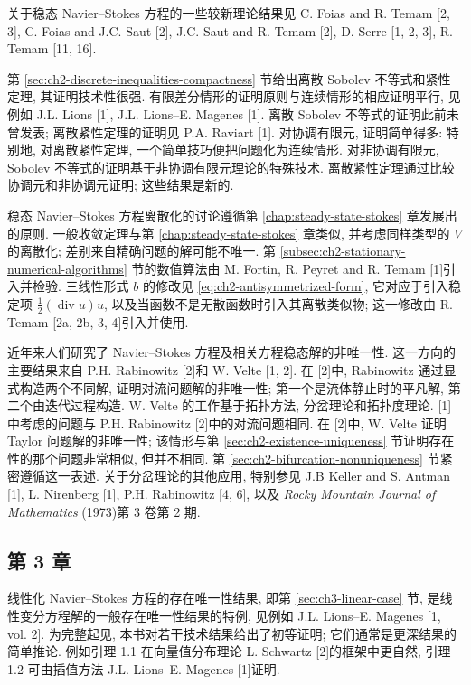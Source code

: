 关于稳态 Navier--Stokes 方程的一些较新理论结果见 C. Foias and R. Temam [2, 3], C. Foias and J.C. Saut [2], J.C. Saut and R. Temam [2], D. Serre [1, 2, 3], R. Temam [11, 16].

\hypertarget{comments-page-398}{}
第 \ref{sec:ch2-discrete-inequalities-compactness} 节给出离散 Sobolev 不等式和紧性定理, 其证明技术性很强. 有限差分情形的证明原则与连续情形的相应证明平行, 见例如 J.L. Lions [1], J.L. Lions--E. Magenes [1]. 离散 Sobolev 不等式的证明此前未曾发表; 离散紧性定理的证明见 P.A. Raviart [1]. 对协调有限元, 证明简单得多: 特别地, 对离散紧性定理, 一个简单技巧便把问题化为连续情形. 对非协调有限元, Sobolev 不等式的证明基于非协调有限元理论的特殊技术. 离散紧性定理通过比较协调元和非协调元证明; 这些结果是新的.

稳态 Navier--Stokes 方程离散化的讨论遵循第 \ref{chap:steady-state-stokes} 章发展出的原则. 一般收敛定理与第 \ref{chap:steady-state-stokes} 章类似, 并考虑同样类型的 $V$ 的离散化; 差别来自精确问题的解可能不唯一. 第 \ref{subsec:ch2-stationary-numerical-algorithms} 节的数值算法由 M. Fortin, R. Peyret and R. Temam [1]引入并检验. 三线性形式 $b$ 的修改见 \eqref{eq:ch2-antisymmetrized-form}, 它对应于引入稳定项 $\frac12(\operatorname{div}u)u$, 以及当函数不是无散函数时引入其离散类似物; 这一修改由 R. Temam [2a, 2b, 3, 4]引入并使用.

近年来人们研究了 Navier--Stokes 方程及相关方程稳态解的非唯一性. 这一方向的主要结果来自 P.H. Rabinowitz [2]和 W. Velte [1, 2]. 在 [2]中, Rabinowitz 通过显式构造两个不同解, 证明对流问题解的非唯一性; 第一个是流体静止时的平凡解, 第二个由迭代过程构造. W. Velte 的工作基于拓扑方法, 分岔理论和拓扑度理论. [1]中考虑的问题与 P.H. Rabinowitz [2]中的对流问题相同. 在 [2]中, W. Velte 证明 Taylor 问题解的非唯一性; 该情形与第 \ref{sec:ch2-existence-uniqueness} 节证明存在性的那个问题非常相似, 但并不相同. 第 \ref{sec:ch2-bifurcation-nonuniqueness} 节紧密遵循这一表述. 关于分岔理论的其他应用, 特别参见 J.B Keller and S. Antman [1], L. Nirenberg [1], P.H. Rabinowitz [4, 6], 以及 \emph{Rocky Mountain Journal of Mathematics} (1973)第 3 卷第 2 期.

\subsection*{第 3 章}

线性化 Navier--Stokes 方程的存在唯一性结果, 即第 \ref{sec:ch3-linear-case} 节, 是线性变分方程解的一般存在唯一性结果的特例, 见例如 J.L. Lions--E. Magenes [1, vol. 2]. 为完整起见, 本书对若干技术结果给出了初等证明; 它们通常是更深结果的简单推论. 例如引理 1.1 在向量值分布理论 L. Schwartz [2]的框架中更自然, 引理 1.2 可由插值方法 J.L. Lions--E. Magenes [1]证明.

